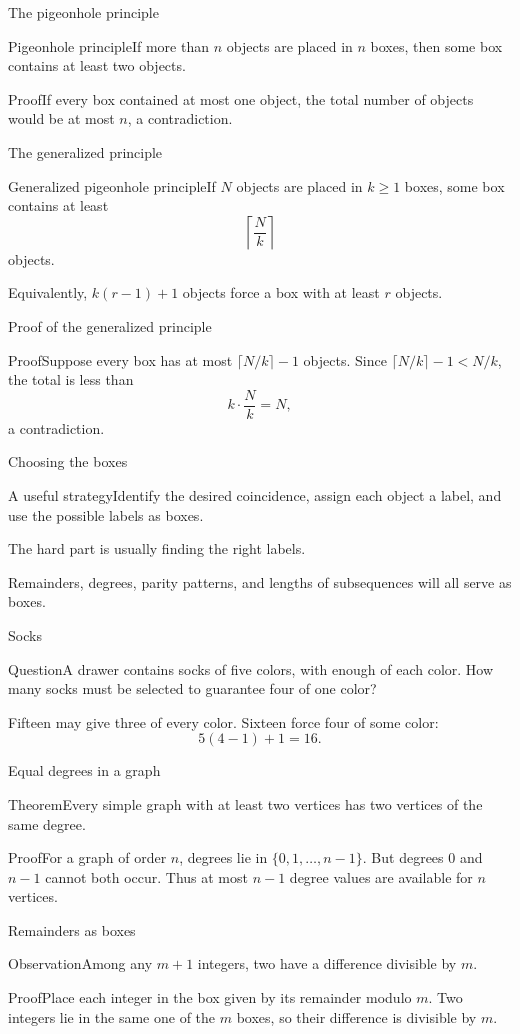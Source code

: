 \documentclass[aspectratio=169,11pt]{beamer}
\newcommand{\Def}[2]{\begin{block}{#1}#2\end{block}}
\newcommand{\Thm}[2]{\begin{block}{#1}#2\end{block}}
\renewcommand{\Proof}[1]{\begin{block}{Proof}\normalsize #1\end{block}}
\newcommand{\Question}[1]{\begin{block}{Question}#1\end{block}}
\newcommand{\gap}{\par\medskip}
\begin{document}
\begin{frame}{The pigeonhole principle}
\large
\Thm{Pigeonhole principle}{If more than $n$ objects are placed in $n$ boxes, then some box contains at least two objects.}
\Proof{If every box contained at most one object, the total number of objects would be at most $n$, a contradiction.}
\end{frame}
\begin{frame}{The generalized principle}
\large
\Thm{Generalized pigeonhole principle}{If $N$ objects are placed in $k\geq1$ boxes, some box contains at least
\[\left\lceil\frac Nk\right\rceil\]
objects.}
\gap Equivalently, $k(r-1)+1$ objects force a box with at least $r$ objects.
\end{frame}
\begin{frame}{Proof of the generalized principle}
\large
\Proof{Suppose every box has at most $\lceil N/k\rceil-1$ objects. Since $\lceil N/k\rceil-1<N/k$, the total is less than
\[k\cdot\frac Nk=N,\]
a contradiction.}
\end{frame}
\begin{frame}{Choosing the boxes}
\large
\Def{A useful strategy}{Identify the desired coincidence, assign each object a label, and use the possible labels as boxes.}
\gap The hard part is usually finding the right labels.
\gap Remainders, degrees, parity patterns, and lengths of subsequences will all serve as boxes.
\end{frame}
\begin{frame}{Socks}
\large
\Question{A drawer contains socks of five colors, with enough of each color. How many socks must be selected to guarantee four of one color?}
\gap Fifteen may give three of every color. Sixteen force four of some color:
\[5(4-1)+1=16.\]
\end{frame}
\begin{frame}{Equal degrees in a graph}
\large
\Thm{Theorem}{Every simple graph with at least two vertices has two vertices of the same degree.}
\Proof{For a graph of order $n$, degrees lie in $\{0,1,\ldots,n-1\}$. But degrees $0$ and $n-1$ cannot both occur. Thus at most $n-1$ degree values are available for $n$ vertices.}
\end{frame}
\begin{frame}{Remainders as boxes}
\large
\Thm{Observation}{Among any $m+1$ integers, two have a difference divisible by $m$.}
\Proof{Place each integer in the box given by its remainder modulo $m$. Two integers lie in the same one of the $m$ boxes, so their difference is divisible by $m$.}
\end{frame}
\end{document}

